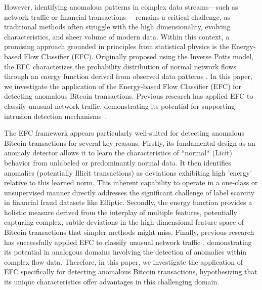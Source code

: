 \documentclass[12pt]{article}
\begin{document}
However, identifying anomalous patterns in complex data streams---such as network traffic or financial transactions
---remains a critical challenge, as traditional methods often struggle with the high dimensionality, evolving characteristics,
and sheer volume of modern data. Within this context, a promising approach grounded in principles from statistical physics
is the Energy-based Flow Classifier (EFC). Originally proposed using the Inverse Potts model, the EFC characterizes the
probability distribution of normal network flows through an energy function derived from observed data patterns \cite{pontes2019}.
In this paper, we investigate the application of the Energy-based Flow Classifier (EFC) for detecting anomalous Bitcoin
transactions. Previous research has applied EFC to classify unusual network traffic, demonstrating its potential for supporting
intrusion detection mechanisms~\cite{pontes2019, souza2022novelopensetenergybased}.

The EFC framework appears particularly well-suited for detecting anomalous Bitcoin transactions for several key reasons.
Firstly, its fundamental design as an anomaly detector allows it to learn the characteristics of *normal* (Licit) behavior
from unlabeled or predominantly normal data. It then identifies anomalies (potentially Illicit transactions) as deviations
exhibiting high 'energy' relative to this learned norm. This inherent capability to operate in a one-class or unsupervised
manner directly addresses the significant challenge of label scarcity in financial fraud datasets like Elliptic. Secondly,
the energy function provides a holistic measure derived from the interplay of multiple features, potentially capturing complex,
subtle deviations in the high-dimensional feature space of Bitcoin transactions that simpler methods might miss. Finally,
previous research has successfully applied EFC to classify unusual network traffic \cite{pontes2019, souza2022novelopensetenergybased},
demonstrating its potential in analogous domains involving the detection of anomalies within complex flow data. Therefore,
in this paper, we investigate the application of EFC specifically for detecting anomalous Bitcoin transactions, hypothesizing
that its unique characteristics offer advantages in this challenging domain.
\end{document}
